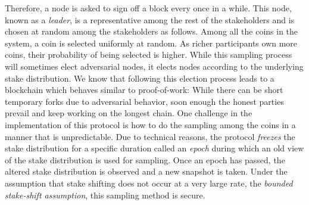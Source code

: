Therefore, a node is asked to sign off a block every once in a while. This node,
known as a \emph{leader}, is a representative among the rest of the stakeholders
and is chosen at random among the stakeholders as follows. Among all the coins
in the system, a coin is selected uniformly at random. As richer participants
own more coins, their probability of being selected is higher. While this
sampling process will sometimes elect adversarial nodes, it elects nodes
according to the underlying stake distribution. We know that following this
election process leads to a blockchain which behaves similar to proof-of-work:
While there can be short temporary forks due to adversarial behavior, soon
enough the honest parties prevail and keep working on the longest chain. One
challenge in the implementation of this protocol is how to do the sampling among
the coins in a manner that is unpredictable. Due to technical reasons, the
protocol \emph{freezes} the stake distribution for a specific duration called an
\emph{epoch} during which an old view of the stake distribution is used for
sampling. Once an epoch has passed, the altered stake distribution is observed
and a new snapshot is taken. Under the assumption that stake shifting does not
occur at a very large rate, the \emph{bounded stake-shift assumption}, this
sampling method is secure.
